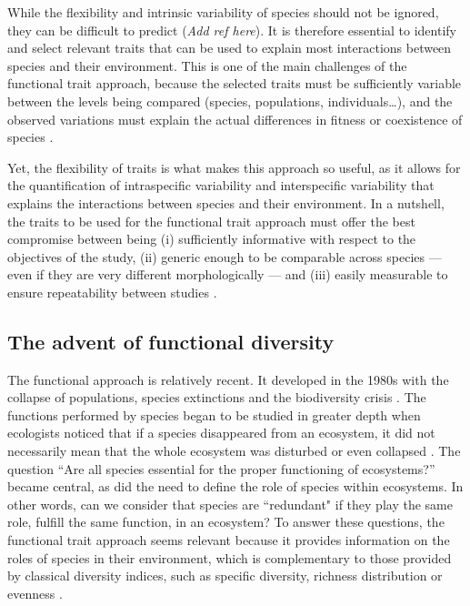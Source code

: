 While the flexibility and intrinsic variability of species should not be ignored, they can be difficult to predict (\emph{Add ref here}). It is therefore essential to identify and select relevant traits that can be used to explain most interactions between species and their environment. This is one of the main challenges of the functional trait approach, because the selected traits must be sufficiently variable between the levels being compared (species, populations, individuals\ldots), and the observed variations must explain the actual differences in fitness or coexistence of species \citep{kremer2017}. 

Yet, the flexibility of traits is what makes this approach so useful, as it allows for the quantification of intraspecific variability \citep[especially as environmental conditions change,][]{martini2020} and interspecific variability that explains the interactions between species and their environment. In a nutshell, the traits to be used for the functional trait approach must offer the best compromise between being (i) sufficiently informative with respect to the objectives of the study, (ii) generic enough to be comparable across species --- even if they are very different morphologically --- and (iii) easily measurable to ensure repeatability between studies \citep{dumay2004, kremer2017}.


\subsection{The advent of functional diversity}

The functional approach is relatively recent. It developed in the 1980s with the collapse of populations, species extinctions and the biodiversity crisis \citep{wilson1988}. The functions performed by species began to be studied in greater depth when ecologists noticed that if a species disappeared from an ecosystem, it did not necessarily mean that the whole ecosystem was disturbed or even collapsed \citep{mejri2009}. The question ``Are all species essential for the proper functioning of ecosystems?'' became central, as did the need to define the role of species within ecosystems. In other words, can we consider that species are ``redundant" if they play the same role, fulfill the same function, in an ecosystem? To answer these questions, the functional trait approach seems relevant because it provides information on the roles of species in their environment, which is complementary to those provided by classical diversity indices, such as specific diversity, richness distribution or evenness \citep{marcon2015,mejri2009}. 

